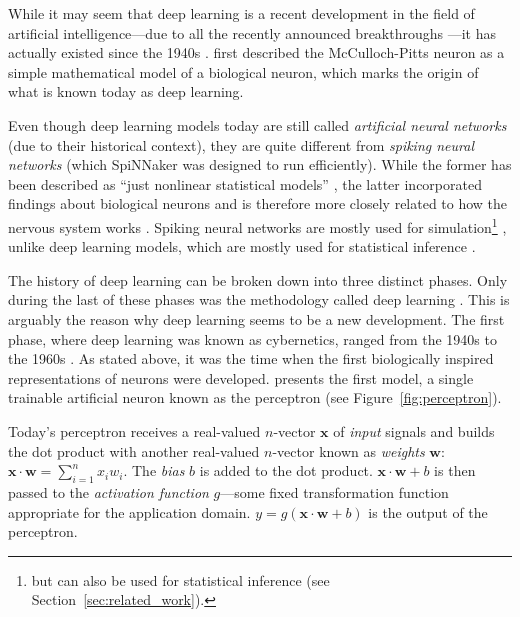\documentclass[]{article}
\begin{document}
While it may seem that deep learning is a recent development in the
field of artificial intelligence---due to all the recently announced
breakthroughs \citep{senior_et_al_2020, vinyals_et_al_2019,
  openai_2019, margi_2019}---it has actually existed since the 1940s
\citep{goodfellow_et_al_2016}.
\citet{mcculloch_et_al_1943} first described the McCulloch-Pitts
neuron as a simple mathematical model of a biological neuron, which
marks the origin of what is known today as deep learning.

Even though deep learning models today are still called
\textit{artificial neural networks} (due to their historical context),
they are quite different from \textit{spiking neural networks}
(which SpiNNaker was designed to run efficiently).
While the former has been described as ``just nonlinear statistical
models'' \citep{hastie_et_al_2009}, the latter incorporated findings
about biological neurons and is therefore more closely related to how
the nervous system works \citep{maass1997}.
Spiking neural networks are mostly used for simulation\footnote{
  but can also be used for statistical inference
  \citep{rueckauer_et_al_2017} (see Section~\ref{sec:related_work}).}
\citep{furber_et_al_2020}, unlike deep learning models, which are
mostly used for statistical inference \citep{goodfellow_et_al_2016}.

The history of deep learning can be broken down into three distinct
phases.
Only during the last of these phases was the methodology
called deep learning \citep{goodfellow_et_al_2016}.
This is arguably the reason why deep learning seems to be a new
development.
The first phase, where deep learning was known as cybernetics, ranged
from the 1940s to the 1960s \citep{goodfellow_et_al_2016}.
As stated above, it was the time when the first biologically
inspired representations of neurons were developed.
\citet{rosenblatt_1958} presents the first model, a single trainable
artificial neuron known as the perceptron (see
Figure~\ref{fig:perceptron}).

Today's perceptron receives a real-valued $n$-vector $\mathbf{x}$ of
\textit{input} signals and builds the dot product with another
real-valued $n$-vector known as \textit{weights} $\mathbf{w}$:
$\mathbf{x}\cdot\mathbf{w} = \sum_{i=1}^{n}x_iw_i$.
The \textit{bias} $b$ is added to the dot product.
$\mathbf{x} \cdot \mathbf{w} + b$ is then passed to the
\textit{activation function} $g$---some fixed transformation function
appropriate for the application domain.
$y = g(\mathbf{x} \cdot \mathbf{w} + b)$ is the output of the
perceptron.
\end{document}

